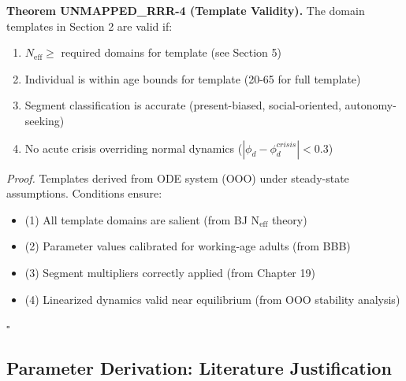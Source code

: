 \begin{tcolorbox}[colback=green!5!white, colframe=green!75!black, title=Theorem UNMAPPED_RRR-4: Template Validity Conditions]
\textbf{Theorem UNMAPPED_RRR-4 (Template Validity).}
The domain templates in Section 2 are valid if:
\begin{enumerate}[nosep]
\item $N_{\text{eff}} \geq$ required domains for template (see Section 5)
\item Individual is within age bounds for template (20-65 for full template)
\item Segment classification is accurate (present-biased, social-oriented, autonomy-seeking)
\item No acute crisis overriding normal dynamics ($|\phi_d - \phi_d^{crisis}| < 0.3$)
\end{enumerate}

\textit{Proof.}
Templates derived from ODE system (OOO) under steady-state assumptions. Conditions ensure:
\begin{itemize}[nosep]
\item (1) All template domains are salient (from BJ N$_{\text{eff}}$ theory)
\item (2) Parameter values calibrated for working-age adults (from BBB)
\item (3) Segment multipliers correctly applied (from Chapter 19)
\item (4) Linearized dynamics valid near equilibrium (from OOO stability analysis)
\end{itemize}
\hfill $\square$
\end{tcolorbox}

\subsection{Parameter Derivation: Literature Justification}

